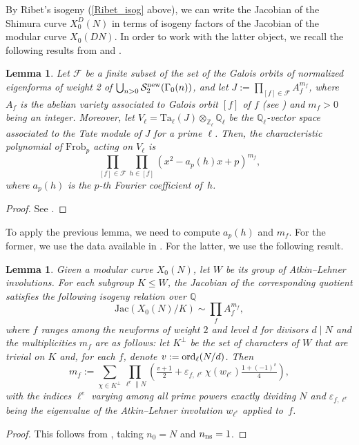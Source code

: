 \documentclass[11pt,reqno]{amsart}
\newcommand{\Q}{\mathbb{Q}}
\newcommand{\Z}{\mathbb{Z}}
\newtheorem{lemma}[theorem]{Lemma}
\theoremstyle{definition}
\begin{document}
By Ribet's isogeny (\cref{Ribet_isog} above), we can write the Jacobian of the Shimura curve $X_0^D(N)$ in terms of isogeny factors of the Jacobian of the modular curve $X_0(DN)$.
In order to work with the latter object, we recall the following results from \cite{DLMS} and \cite{DLMS26}.

\begin{lemma}\label{prop4.4_DLMS}
Let $\mathcal F$ be a finite subset of the set of the Galois orbits of normalized eigenforms of weight 2 of $\bigcup_{n>0}\mathcal S_2^{\textnormal{new}}(\Gamma_0(n))$, and let $J:=\prod_{[f]\in\mathcal F}A_f^{m_f}$, where $A_f$ is the abelian variety associated to Galois orbit $[f]$ of $f$ (see \cite[Definition~6.6.3]{DS05}) and $m_f>0$ being an integer. Moreover, let $V_\ell=\mathrm{Ta}_\ell(J)\otimes_{\Z_\ell} \Q_\ell$ be the $\Q_\ell$-vector space associated to the Tate module of $J$ for a prime $\ell$. 
Then, the characteristic polynomial of $\mathrm{Frob}_p$ acting on $V_\ell$ is 
$$
\prod_{[f]\in\mathcal F}\prod_{h\in [f]} (x^2-a_p(h)x+p)^{m_f},
$$
where $a_p(h)$ is the $p$-th Fourier coefficient of~$h$.
\end{lemma}
\begin{proof}
See \cite[Proposition 4.4]{DLMS}.
\end{proof}

To apply the previous lemma, we need to compute $a_p(h)$ and $m_f$. For the former, we use the data available in \cite{LMFDB}. For the latter, we use the following result.

\begin{lemma}\label{theo2.2_DLMS26}
Given a modular curve $X_0(N)$, let $W$ be its group of Atkin--Lehner involutions. For each subgroup $K \leq W$, the Jacobian of the corresponding quotient satisfies the following isogeny relation over $\Q$
\[
\mathrm{Jac}(X_0(N)/K)\sim \textstyle\prod_f A_f^{m_f},
\]
where $f$ ranges among the newforms of weight $2$ and level $d$ for divisors $d \mid N$ and the multiplicities $m_f$ are as follows: let $K^\perp$ be the set of characters of $W$ that are trivial on $K$ and, for each $f$, denote $v:=\textnormal{ord}_\ell(N/d)$. Then
\[
m_f:=\sum_{\chi\in K^\perp}   \prod_{\ell^e \parallel N} \left(\tfrac{v+1}{2}+\varepsilon_{f,\ell^e}\chi(w_{\ell^e})\tfrac{1+(-1)^{v}}{4} \right),
\]
with the indices $\ell^e$ varying among all prime powers exactly dividing $N$ and $\varepsilon_{f,\ell^e}$ being the eigenvalue of the Atkin--Lehner involution $w_{\ell^e}$ applied to~$f$.
\end{lemma}
\begin{proof}
This follows from \cite[Theorem 2.2]{DLMS26}, taking $n_0=N$ and $n_{\textnormal{ns}}=1$.
\end{proof}
\end{document}
